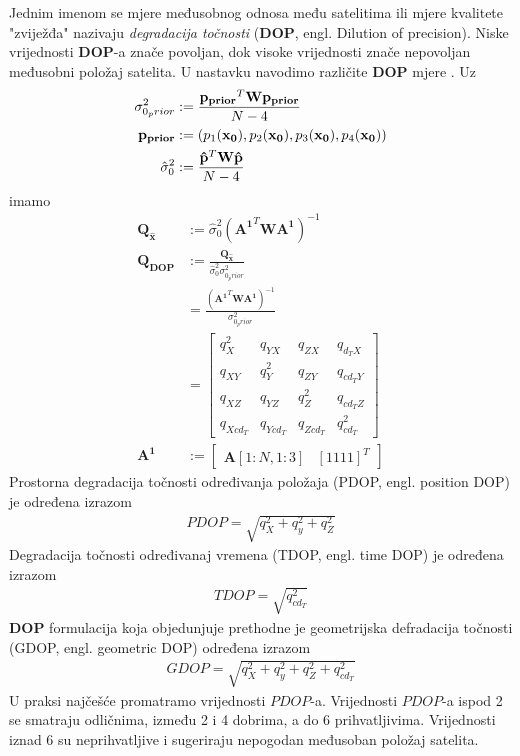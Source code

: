 \documentclass[a4paper,twoside,12pt]{memoir} %
\begin{document}
Jednim imenom se mjere međusobnog odnosa među satelitima ili mjere kvalitete "zviježđa" nazivaju \textit{degradacija točnosti} (\textbf{DOP}, engl. Dilution of precision).
Niske vrijednosti \textbf{DOP}-a znače povoljan, dok 
visoke vrijednosti znače nepovoljan međusobni položaj satelita.
U nastavku navodimo različite \textbf{DOP} mjere \cite{svd_str15}.
Uz%
\begin{align}
\sigma_{0_prior}^2 & := \frac{\mathbf{p_{prior}}^T \mathbf{W}\mathbf{p_{prior}}}{N-4}\\
\mathbf{p_{prior}} & := (p_1(\mathbf{x_0}),p_2(\mathbf{x_0}),p_3(\mathbf{x_0}),p_4(\mathbf{x_0})) \notag \\
\hat{\sigma}_0^2 & := \frac{\mathbf{\hat{p}}^T \mathbf{W}\mathbf{\hat{p}}}{N - 4}
\end{align}
imamo
\begin{align}
\mathbf{Q_{\hat{x}}} & := \hat{\sigma}_0^2(\mathbf{A^1}^T\mathbf{W}\mathbf{A^1})^{-1} \\
\mathbf{Q_{DOP}} & := \frac{\mathbf{Q_{\hat{x}}}}{\hat{\sigma}_0^2 \sigma_{0_prior}^2} \\
& = \frac{(\mathbf{A^1}^T\mathbf{W}\mathbf{A^1})^{-1}}{\sigma_{0_prior}^2} \\
& = \begin{bmatrix}
q_X^2 & q_{YX} & q_{ZX} & q_{d_TX} \\
q_{XY} & q_Y^2 & q_{ZY} & q_{cd_TY} \\
q_{XZ} & q_{YZ} & q_Z^2 & q_{cd_TZ} \\
q_{Xcd_T} & q_{Ycd_T} & q_{Zcd_T} & q_{cd_T}^2 
\end{bmatrix}\\
\mathbf{A^1} & := \begin{bmatrix}
\mathbf{A}[1:N,1:3] & [1 1 1 1]^T
\end{bmatrix}
\end{align}
Prostorna degradacija točnosti određivanja položaja (PDOP, engl. position DOP) je određena izrazom
\begin{align}
PDOP = \sqrt{q_X^2+q_y^2+q_Z^2}
\end{align}
Degradacija točnosti određivanaj vremena (TDOP, engl. time DOP) je određena izrazom
\begin{align}
TDOP = \sqrt{q_{cd_T}^2}
\end{align}
\textbf{DOP} formulacija koja objedunjuje prethodne je geometrijska defradacija točnosti (GDOP, engl. geometric DOP) određena izrazom
\begin{align}
GDOP = \sqrt{q_X^2+q_y^2+q_Z^2+q_{cd_T}^2}
\end{align}
U praksi najčešće promatramo  vrijednosti $PDOP$-a. Vrijednosti $PDOP$-a ispod 2 se smatraju odličnima, između 2 i 4 dobrima, a do 6 prihvatljivima. Vrijednosti iznad 6 su neprihvatljive i sugeriraju nepogodan međusoban položaj satelita.
\end{document}
